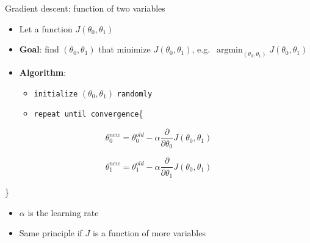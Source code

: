 \documentclass[
  9pt,
  ignorenonframetext,
  aspectratio=169,
  t, dvipsnames]{beamer}
\providecommand{\tightlist}{%
  \setlength{\itemsep}{0pt}\setlength{\parskip}{0pt}}\usepackage{longtable,booktabs,array}
\DeclareMathOperator*{\argmin}{argmin}
\theoremstyle{definition}
\begin{document}
\begin{frame}[fragile]{Gradient descent: function of two variables}
\protect\hypertarget{gradient-descent-function-of-two-variables}{}
\begin{itemize}
\item
  Let a function \(J(\theta_0, \theta_1)\)
\item
  \textbf{Goal}: find \((\theta_0,\theta_1)\) that minimize
  \(J(\theta_0, \theta_1)\),
  e.g.~\(\argmin_{(\theta_0,\theta_1)} J(\theta_0, \theta_1)\)
\item
  \textbf{Algorithm}:

  \begin{itemize}
  \tightlist
  \item
    \texttt{initialize} \((\theta_0,\theta_1)\) \texttt{randomly}
  \item
    \texttt{repeat\ until\ convergence}\{
  \end{itemize}
\end{itemize}

\[\theta_0^{new} = \theta_0^{old} - \alpha \frac{\partial }{\partial \theta_0} J(\theta_0, \theta_1)\]

\[\theta_1^{new} = \theta_1^{old} - \alpha \frac{\partial }{\partial \theta_1} J(\theta_0, \theta_1)\]

\text{                            } \}

\begin{itemize}
\tightlist
\item
  \(\alpha\) is the learning rate
\item
  Same principle if \(J\) is a function of more variables
\end{itemize}
\end{frame}
\end{document}
